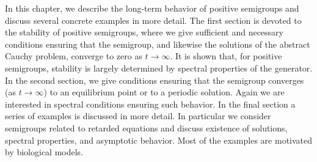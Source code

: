 \label{chap:c4}%
\thispagestyle{empty}
In this chapter, we describe the long-term behavior of positive semigroups and discuss several concrete examples in more detail. The first section is devoted to the stability of positive semigroups, where we give sufficient and necessary conditions ensuring that the semigroup, and likewise the solutions of the abstract Cauchy problem, converge to zero as $t \to \infty$.
 It is shown that, for positive semigroups, stability is largely determined by spectral properties of the generator. 
In the second section, we give conditions ensuring that the semigroup converges (as $t\to\infty$) to an equilibrium point or to a periodic solution.
Again we are interested in spectral conditions ensuring such behavior.
In the final section a series of examples is discussed in more detail.
In particular we consider semigroups related to retarded equations and discuss existence of solutions, spectral properties, and asymptotic behavior.
Most of the examples are motivated by biological models.

